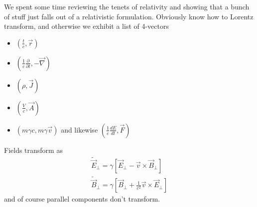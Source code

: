 \documentclass[10pt,twocolumn]{article}
\newcommand{\rd}[2]{\frac{d#1}{d#2}}
\newcommand{\pd}[2]{\frac{\partial#1}{\partial#2}}
\begin{document}
We spent some time reviewing the tenets of relativity and showing that a bunch of stuff just falls out of a relativistic formulation. Obviously know how to Lorentz transform, and otherwise we exhibit a list of 4-vectors
\begin{itemize}
    \item $\left( \frac{t}{c}, \vec{r} \right)$
    \item $\left(\frac{1}{c}\pd{}{t}, -\vec{\nabla}\right)$
    \item $(\rho, \vec{J})$
    \item $\left( \frac{V}{c}, \vec{A} \right)$
    \item $(m\gamma c, m\gamma\vec{v})$ and likewise $\left( \frac{1}{c}\rd{E}{t}, \vec{F} \right)$
\end{itemize}

Fields transform as
\begin{align}
    \tilde{\vec{E}}_{\perp} = \gamma\left[ \vec{E}_{\perp} - \vec{v} \times \vec{B}_{\perp} \right]\\
    \tilde{\vec{B}}_{\perp} = \gamma\left[ \vec{B}_{\perp} +\frac{1}{c^2} \vec{v} \times \vec{E}_{\perp} \right]
\end{align}
and of course parallel components don't transform. 
\end{document}
